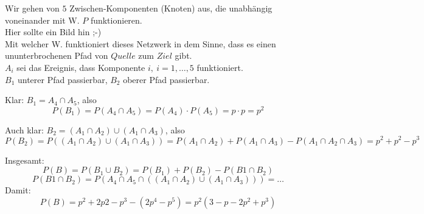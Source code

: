 Wir gehen von $5$ Zwischen-Komponenten (Knoten) aus, die unabhängig voneinander mit W. $P$ funktionieren.\\
Hier sollte ein Bild hin ;-)\\

Mit welcher W. funktioniert dieses Netzwerk in dem Sinne, dass es einen ununterbrochenen Pfad von $Quelle$ zum $Ziel$ gibt.\\
$A_i$ sei das Ereignis, dass Komponente $i,\ i=1,\ldots,5$ funktioniert.\\
$B_1$ unterer Pfad passierbar, $B_2$ oberer Pfad passierbar.

Klar: 
$
	B_1 = A_4 \cap A_5
$, also
\[
	P(B_1) = P(A_4\cap A_5) = P(A_4)\cdot P(A_5) = p\cdot p = p^2
\]

Auch klar:
$
	B_2 = (A_1 \cap A_2) \cup (A_1 \cap A_3)
$, also
\[
	P(B_2) = P((A_1\cap A_2) \cup (A_1\cap A_3))  = P(A_1 \cap A_2) + P(A_1 \cap A_3) - P(A_1\cap A_2\cap A_3) = p^2 + p^2 - p^3
\]

Insgesamt:
\[
	P(B) = P(B_1 \cup B_2) = P(B_1) + P(B_2) - P(B1 \cap B_2)
\]
\[
	P(B1 \cap B_2) = P\left( A_4 \cap A_5 \cap ((A_1\cap A_2) \cup (A_1\cap A_3)) \right) = \ldots
\]
Damit:
\[
	P(B) = p^2 + 2p2 - p^3 - (2p^4-p^5) = p^2(3-p-2p^2+p^3)
\]
